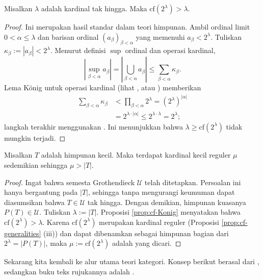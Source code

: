 \begin{proposition}\label{prop:cf-Konig}
	Misalkan $\lambda$ adalah kardinal tak hingga. Maka $\mathrm{cf}(2^\lambda) > \lambda$.
\end{proposition}
\begin{proof}
	Ini merupakan hasil standar dalam teori himpunan. Ambil ordinal limit $0 < \alpha \leq \lambda$ dan barisan ordinal $(a_\beta)_{\beta < \alpha}$ yang memenuhi $a_\beta < 2^\lambda$. Tuliskan $\kappa_\beta := |a_\beta| < 2^\lambda$. Menurut definisi $\sup$ ordinal dan operasi kardinal,
	\[ \left| \sup_{\beta < \alpha} a_\beta \right| = \left| \bigcup_{\beta < \alpha} a_\beta \right| \leq \sum_{\beta < \alpha} \kappa_\beta. \]
	Lema König untuk operasi kardinal (lihat \cite[Latihan 1.6]{Li1}, atau \cite[Teorema 5.10]{Je03}) memberikan
	\begin{align*}
		\sum_{\beta < \alpha} \kappa_\beta & < \prod_{\beta < \alpha} 2^\lambda = (2^\lambda)^{|\alpha|} \\
		& = 2^{\lambda \cdot |\alpha|} \leq 2^{\lambda \cdot \lambda} = 2^\lambda ;
	\end{align*}
	langkah terakhir menggunakan \cite[Teorema 1.4.8]{Li1}. Ini menunjukkan bahwa $\lambda \geq \mathrm{cf}(2^\lambda)$ tidak mungkin terjadi.
\end{proof}

\begin{lemma}\label{prop:enough-regular-cardinal}
	Misalkan $T$ adalah himpunan kecil. Maka terdapat kardinal kecil reguler $\mu$ sedemikian sehingga $\mu > |T|$.
\end{lemma}
\begin{proof}
	Ingat bahwa semesta Grothendieck $\mathcal{U}$ telah ditetapkan. Persoalan ini hanya bergantung pada $|T|$, sehingga tanpa mengurangi keumuman dapat diasumsikan bahwa $T \in \mathcal{U}$ tak hingga. Dengan demikian, himpunan kuasanya $P(T) \in \mathcal{U}$. Tuliskan $\lambda := |T|$. Proposisi \ref{prop:cf-Konig} menyatakan bahwa $\mathrm{cf}(2^\lambda) > \lambda$. Karena $\mathrm{cf}(2^\lambda)$ merupakan kardinal reguler (Proposisi \ref{prop:cf-generalities} (iii)) dan dapat dibenamkan sebagai himpunan bagian dari $2^\lambda = |P(T)|$, maka $\mu := \mathrm{cf}(2^\lambda)$ adalah yang dicari.
\end{proof}

Sekarang kita kembali ke alur utama teori kategori. Konsep berikut berasal dari \cite{GU71}, sedangkan buku teks rujukannya adalah \cite[Chapters 1, 2]{AR94}.

